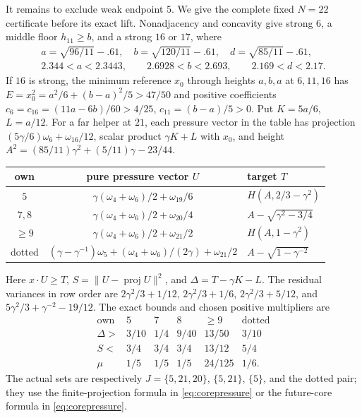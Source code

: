 \documentclass[11pt]{article}
\theoremstyle{definition}
\theoremstyle{remark}
\begin{document}
It remains to exclude weak endpoint $5$. We give the complete fixed
$N=22$ certificate before its exact lift. Nonadjacency and concavity
give strong $6$, a middle floor $h_{11}\ge b$, and a strong $16$
or $17$, where
\[
\begin{gathered}
 a=\sqrt{96/11}-.61,\quad b=\sqrt{120/11}-.61,\quad
 d=\sqrt{85/11}-.61,\\
 2.344<a<2.3443,\qquad 2.6928<b<2.693,\qquad 2.169<d<2.17.
\end{gathered}
\]
If $16$ is strong, the minimum reference $x_0$ through heights
$a,b,a$ at $6,11,16$ has
$E=x_0^2=a^2/6+(b-a)^2/5>47/50$ and positive coefficients
$c_6=c_{16}=(11a-6b)/60>4/25$, $c_{11}=(b-a)/5>0$.
Put $K=5a/6$, $L=a/12$. For a far helper at $21$, each pressure
vector in the table has projection
$(5\gamma/6)\omega_6+\omega_{16}/12$, scalar product
$\gamma K+L$ with $x_0$, and height
$A^2=(85/11)\gamma^2+(5/11)\gamma-23/44$.
\begin{center}\small
\begin{tabular}{ccl}
\toprule
own&pure pressure vector $U$&target $T$\\ \midrule
$5$&$\gamma(\omega_4+\omega_6)/2+\omega_{19}/6$
 &$H(A,2/3-\gamma^2)$\\
$7,8$&$\gamma(\omega_4+\omega_6)/2+\omega_{20}/4$
 &$A-\sqrt{\gamma^2-3/4}$\\
$\ge9$&$\gamma(\omega_4+\omega_6)/2+\omega_{21}/2$
 &$H(A,1-\gamma^2)$\\
dotted&$(\gamma-\gamma^{-1})\omega_5+
 (\omega_4+\omega_6)/(2\gamma)+\omega_{21}/2$
 &$A-\sqrt{1-\gamma^{-2}}$\\ \bottomrule
\end{tabular}\end{center}
Here $x\cdot U\ge T$, $S=\|U-\operatorname{proj}U\|^2$,
and $\Delta=T-\gamma K-L$. The residual variances in row order are
$2\gamma^2/3+1/12$, $2\gamma^2/3+1/6$,
$2\gamma^2/3+5/12$, and $5\gamma^2/3+\gamma^{-2}-19/12$.
The exact bounds and chosen positive multipliers are
\[
\begin{array}{c|ccccc}
\text{own}&5&7&8&\ge9&\text{dotted}\\ \hline
\Delta>&3/10&1/4&9/40&13/50&3/10\\
S<&3/4&3/4&3/4&13/12&5/4\\
\mu&1/5&1/5&1/5&24/125&1/6.
\end{array}
\]
The actual sets are respectively
$J=\{5,21,20\}$, $\{5,21\}$, $\{5\}$, and the dotted pair;
they use the finite-projection formula in \eqref{eq:corepressure} or the future-core formula in \eqref{eq:corepressure}.
\end{document}
